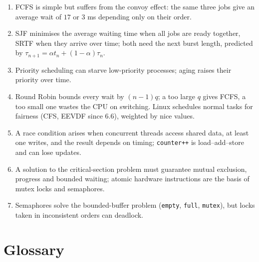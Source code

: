 \documentclass[11pt,a4paper]{article}
\begin{document}
\begin{keyidea}
\begin{enumerate}[leftmargin=1.4em]
  \item FCFS is simple but suffers from the convoy effect: the same three jobs give an average wait of $17$ or $3$ ms depending only on their order.
  \item SJF minimises the average waiting time when all jobs are ready together, SRTF when they arrive over time; both need the next burst length, predicted by $\tau_{n+1} = \alpha t_n + (1-\alpha)\tau_n$.
  \item Priority scheduling can starve low-priority processes; aging raises their priority over time.
  \item Round Robin bounds every wait by $(n-1)q$; a too large $q$ gives FCFS, a too small one wastes the CPU on switching. Linux schedules normal tasks for fairness (CFS, EEVDF since 6.6), weighted by nice values.
  \item A race condition arises when concurrent threads access shared data, at least one writes, and the result depends on timing; \texttt{counter++} is load--add--store and can lose updates.
  \item A solution to the critical-section problem must guarantee mutual exclusion, progress and bounded waiting; atomic hardware instructions are the basis of mutex locks and semaphores.
  \item Semaphores solve the bounded-buffer problem (\texttt{empty}, \texttt{full}, \texttt{mutex}), but locks taken in inconsistent orders can deadlock.
\end{enumerate}
\end{keyidea}

\section{Glossary}
\end{document}
